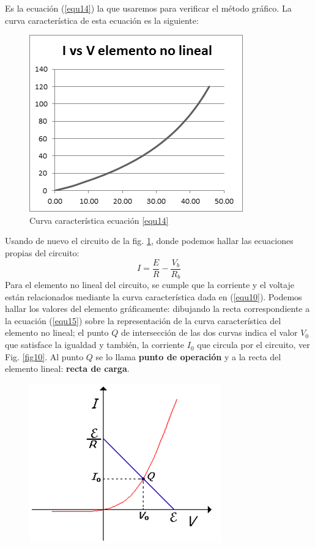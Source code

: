 \documentclass[twocolumn]{IEEEtran}
\begin{document}
\begin{enumerate}
\begin{equation}
\end{equation}
\noindent
Es la ecuación (\ref{equ14}) la que usaremos para verificar  el método gráfico. La curva característica de esta ecuación es la siguiente:
\begin{figure}[H]
	\centering
		\includegraphics[scale=0.7]{g1.png}
	\caption{Curva característica ecuación \ref{equ14}}
	\label{fig9}
\end{figure}
\noindent
Usando de nuevo el circuito de la fig. \ref{fig9},  donde podemos hallar las ecuaciones propias del circuito:
\begin{equation}
 I=\frac{E}{R} - \frac{V_b}{R_b}
\label{equ15}
\end{equation}
\noindent
Para el elemento no lineal del circuito, se cumple que la corriente y el voltaje están relacionados mediante la curva característica dada en (\ref{equ10}). Podemos hallar los valores del elemento gráficamente: dibujando la recta correspondiente a la ecuación (\ref{equ15}) sobre la representación de la curva característica del elemento no lineal; el punto \textbf{$Q$} de intersección de las dos curvas indica el valor $V_0$ que satisface la igualdad y también, la corriente $I_0$ que circula por el circuito, ver Fig. \ref{fig10}. Al punto $Q$ se lo llama \textbf{punto de operación} y a la recta del elemento lineal: \textbf{recta de carga}.
\begin{figure}[H]
	\centering
		\includegraphics[scale=0.9]{f1.png}

\end{figure}
\end{enumerate}
\end{document}
